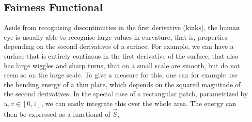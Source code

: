 \subsection{Fairness Functional}%
Aside from recognising discontinuities in the first derivative (kinks), the human eye is usually able to recognise large values in curvature, that is, properties depending on the second derivatives of a surface. For example, we can have a surface that is entirely continous in the first derivative of the surface, that also has large wiggles and sharp turns, that on a small scale are smooth, but do not seem so on the large scale. %
To give a measure for this, one can for example use the bending energy of a thin plate, which depends on the squared magnitude of the second derivatives. In the special case of a rectangular patch, parametrized by $u,v\in \left[0,1\right]$, we can easily integrate this over the whole area. The energy can then be expressed as a functional of $\vec{S}$,

